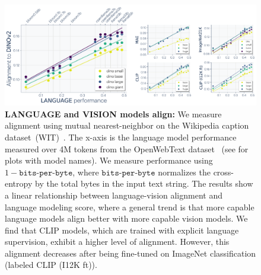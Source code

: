 \documentclass{article}
\theoremstyle{plain}
\theoremstyle{definition}
\theoremstyle{remark}
\begin{document}
\begin{figure}[t!]
    \centering
    
    \includegraphics[width=1.0\linewidth, trim=0 0 0 16]{figures/llm_to_vision_ppl.pdf}
    \vspace{-22pt}
    \caption{\small\textbf{LANGUAGE and VISION models align:} 
    We measure alignment using mutual nearest-neighbor on the Wikipedia caption dataset~(WIT)~\cite{srinivasan2021wit}. The x-axis is the language model performance measured over 4M tokens from the OpenWebText dataset~\cite{Gokaslan2019OpenWeb} (see  for plots with model names). 
    We measure performance using $1 - \texttt{bits-per-byte}$, where $\texttt{bits-per-byte}$ normalizes the cross-entropy by the total bytes in the input text string.
    The results show a linear relationship between language-vision alignment and language modeling score, where a general trend is that more capable language models align better with more capable vision models. 
    We find that CLIP models, which are trained with explicit language supervision, exhibit a higher level of alignment. However, this alignment decreases after being fine-tuned on ImageNet classification (labeled CLIP (I12K ft)).
    }%
    \label{fig:alignment_comparisons}
    \vspace{-4pt}
\end{figure}
\end{document}
